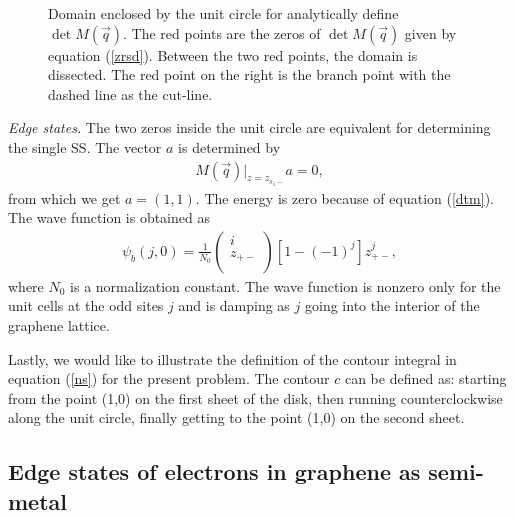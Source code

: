 \documentclass[aps,pra,amsmath,twocolumn,showpacs,bibnotes,10pt]{revtex4-1}
\begin{document}
\begin{figure}[t]
\centerline{}
\caption{Domain enclosed by the unit circle for analytically define $\det M(\vec q)$. The red points are the zeros of $\det M(\vec q)$ given by equation (\ref{zrsd}). Between the two red points, the domain is dissected. The red point on the right is the branch point with the dashed line as the cut-line.} 
\end{figure}

{\it Edge states.} The two zeros inside the unit circle are equivalent for determining the single SS. The vector $a$ is determined by
\begin{eqnarray}
M(\vec q)|_{z=z_{s_1-}}a = 0,  \nonumber
\end{eqnarray}
from which we get $a =(1,1)$. The energy is zero because of equation (\ref{dtm}). The wave function is obtained as
\begin{eqnarray}
\psi_b(j,0) = \frac{1}{N_0}\begin{pmatrix}
	i\\
	z_{+-}\\
\end{pmatrix}[1-(-1)^j]z^j_{+-},  \nonumber
\end{eqnarray}
where $N_0$ is a normalization constant. The wave function is nonzero only for the unit cells at the odd sites $j$ and is damping as $j$ going into the interior of the graphene lattice.

Lastly, we would like to illustrate the definition of the contour integral in equation (\ref{ns}) for the present problem. The contour $c$ can be defined as: starting from the point (1,0) on the first sheet of the disk, then running counterclockwise along the unit circle, finally getting to the point (1,0) on the second sheet.

\subsection{Edge states of electrons in graphene as semi-metal}
\end{document}
